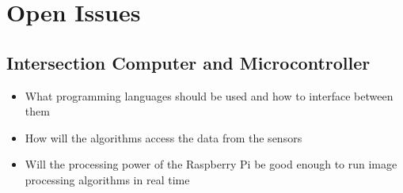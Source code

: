 \documentclass [11pt]{article}
\begin{document}
\section{Open Issues}


\subsection{Intersection Computer and Microcontroller}

\begin{itemize}
    \item  What programming languages should be used and how to interface between them
    \item How will the algorithms access the data from the sensors
    \item Will the processing power of the Raspberry Pi be good enough to run image processing algorithms in real time
\end{itemize}
\end{document}
